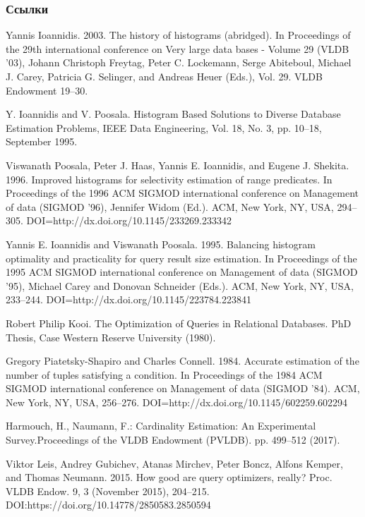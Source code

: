 \documentclass{beamer}
\begin{document}
\begin{frame}[allowframebreaks]
\frametitle{Ссылки}
\footnotesize{
\begin{thebibliography}{99}

  Yannis Ioannidis. 2003. The history of histograms (abridged). In Proceedings of the 29th international conference on Very large data bases - Volume 29 (VLDB '03), Johann Christoph Freytag, Peter C. Lockemann, Serge Abiteboul, Michael J. Carey, Patricia G. Selinger, and Andreas Heuer (Eds.), Vol. 29. VLDB Endowment 19--30. 

 Y. Ioannidis and V. Poosala. Histogram Based Solutions to Diverse Database Estimation Problems, IEEE Data Engineering, Vol. 18, No. 3, pp. 10--18, September 1995.

 Viswanath Poosala, Peter J. Haas, Yannis E. Ioannidis, and Eugene J. Shekita. 1996. Improved histograms for selectivity estimation of range predicates. In Proceedings of the 1996 ACM SIGMOD international conference on Management of data (SIGMOD '96), Jennifer Widom (Ed.). ACM, New York, NY, USA, 294--305. DOI=http://dx.doi.org/10.1145/233269.233342 

   Yannis E. Ioannidis and Viswanath Poosala. 1995. Balancing histogram optimality and practicality for query result size estimation. In Proceedings of the 1995 ACM SIGMOD international conference on Management of data (SIGMOD '95), Michael Carey and Donovan Schneider (Eds.). ACM, New York, NY, USA, 233--244. DOI=http://dx.doi.org/10.1145/223784.223841 



 Robert Philip Kooi. The Optimization of Queries in Relational Databases. PhD Thesis, Case Western Reserve University (1980).

 Gregory Piatetsky-Shapiro and Charles Connell. 1984. Accurate estimation of the number of tuples satisfying a condition. In Proceedings of the 1984 ACM SIGMOD international conference on Management of data (SIGMOD '84). ACM, New York, NY, USA, 256--276. DOI=http://dx.doi.org/10.1145/602259.602294 

 Harmouch, H., Naumann, F.: Cardinality Estimation: An Experimental Survey.Proceedings of the VLDB Endowment (PVLDB). pp. 499--512 (2017).

 Viktor Leis, Andrey Gubichev, Atanas Mirchev, Peter Boncz, Alfons Kemper, and Thomas Neumann. 2015. How good are query optimizers, really? Proc. VLDB Endow. 9, 3 (November 2015), 204--215. DOI:https://doi.org/10.14778/2850583.2850594





\end{thebibliography}
}
\end{frame}
\end{document}

